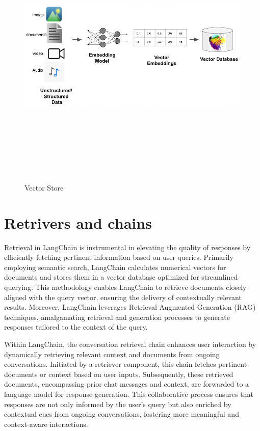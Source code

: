\documentclass[12pt,a4paper,oneside]{report}
\begin{document}
\begin{figure}[ht]
    \centering
    \includegraphics[width=145mm , height = 130mm]{images/vector.png}
    \caption{Vector Store}
    \label{fig:figure2_2}
\end{figure}

\section{Retrivers and chains}
\par Retrieval in LangChain is instrumental in elevating the quality of responses by efficiently fetching pertinent information based on user queries. Primarily employing semantic search, LangChain calculates numerical vectors for documents and stores them in a vector database optimized for streamlined querying. This methodology enables LangChain to retrieve documents closely aligned with the query vector, ensuring the delivery of contextually relevant results. Moreover, LangChain leverages Retrieval-Augmented Generation (RAG) techniques, amalgamating retrieval and generation processes to generate responses tailored to the context of the query.

Within LangChain, the conversation retrieval chain enhances user interaction by dynamically retrieving relevant context and documents from ongoing conversations. Initiated by a retriever component, this chain fetches pertinent documents or context based on user inputs. Subsequently, these retrieved documents, encompassing prior chat messages and context, are forwarded to a language model for response generation. This collaborative process ensures that responses are not only informed by the user's query but also enriched by contextual cues from ongoing conversations, fostering more meaningful and context-aware interactions.
\end{document}
